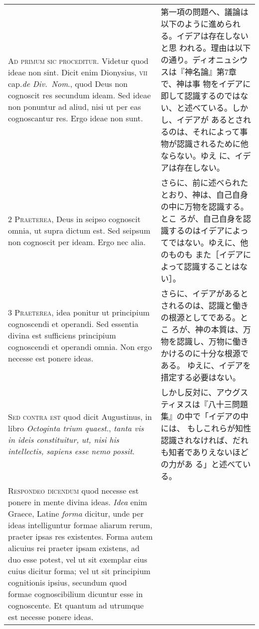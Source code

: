 \documentclass[10pt]{jsarticle} %
\begin{document}
\begin{longtable}{p{21em}p{21em}}


{\huge A}{\scshape d primum sic proceditur}. Videtur quod ideae non
sint. Dicit enim Dionysius, {\scshape vii} cap.{\itshape de Div.~Nom}.,
quod Deus non cognoscit res secundum ideam. Sed ideae non ponuntur ad
aliud, nisi ut per eas cognoscantur res. Ergo ideae non sunt.

&

 第一項の問題へ、議論は以下のように進められる。イデアは存在しないと思
 われる。理由は以下の通り。ディオニュシウスは『神名論』第7章で、神は事
 物をイデアに即して認識するのではない、と述べている。しかし、イデアが
 あるとされるのは、それによって事物が認識されるために他ならない。ゆえ
 に、イデアは存在しない。

\\


{\scshape 2 Praeterea}, Deus in seipso cognoscit omnia, ut supra
dictum est. Sed seipsum non cognoscit per ideam. Ergo nec alia.

&

さらに、前に述べられたとおり、神は、自己自身の中に万物を認識する。とこ
ろが、自己自身を認識するのはイデアによってではない。ゆえに、他のものも
また［イデアによって認識することはない］。

\\


{\scshape 3 Praeterea}, idea ponitur ut principium
cognoscendi et operandi. Sed essentia divina est sufficiens principium
cognoscendi et operandi omnia. Non ergo necesse est ponere ideas.

&

 さらに、イデアがあるとされるのは、認識と働きの根源としてである。とこ
 ろが、神の本質は、万物を認識し、万物に働きかけるのに十分な根源である。
 ゆえに、イデアを措定する必要はない。


\\


{\scshape Sed contra est} quod dicit Augustinus, in libro {\itshape
Octoginta trium quaest}., {\itshape tanta vis in ideis constituitur, ut,
nisi his intellectis, sapiens esse nemo possit}.

&

しかし反対に、アウグスティヌスは『八十三問題集』の中で「イデアの中には、
 もしこれらが知性認識されなければ、だれも知者でありえないほどの力があ
 る」と述べている。

\\


{\scshape Respondeo dicendum} quod necesse est ponere in mente divina
ideas. {\itshape Idea} enim Graece, Latine {\itshape forma} dicitur,
unde per ideas intelliguntur formae aliarum rerum, praeter ipsas res
existentes. Forma autem alicuius rei praeter ipsam existens, ad duo
esse potest, vel ut sit exemplar eius cuius dicitur forma; vel ut sit
principium cognitionis ipsius, secundum quod formae cognoscibilium
dicuntur esse in cognoscente. Et quantum ad utrumque est necesse
ponere ideas.



\end{longtable}
\end{document}
